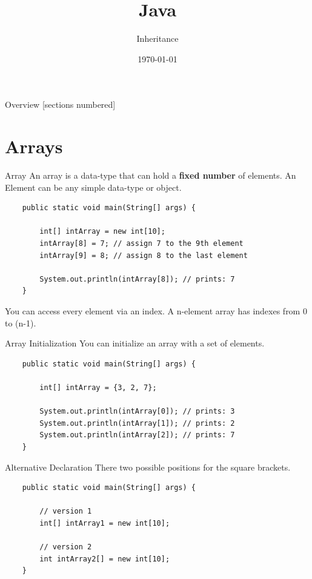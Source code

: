 


\title{Java}
\subtitle{Inheritance}
\date{\today}



\begin{frame}
	\titlepage
\end{frame}
\begin{frame}{Overview}
	[sections numbered]
	\tableofcontents
\end{frame}



\section{Arrays}
\begin{frame}[fragile]{Array}
	An array is a data-type that can hold a \textbf{fixed number} of elements. 
	An Element can be any simple data-type or object.
	\begin{lstlisting}
	public static void main(String[] args) {
	
	    int[] intArray = new int[10];
	    intArray[8] = 7; // assign 7 to the 9th element
	    intArray[9] = 8; // assign 8 to the last element
	    
	    System.out.println(intArray[8]); // prints: 7
	}
	\end{lstlisting}
	You can access every element via an index. A n-element array has indexes from 0 to (n-1).
\end{frame}

\begin{frame}[fragile]{Array Initialization} %
	You can initialize an array with a set of elements.
	\begin{lstlisting}
	public static void main(String[] args) {
	
	    int[] intArray = {3, 2, 7};
	    
	    System.out.println(intArray[0]); // prints: 3
	    System.out.println(intArray[1]); // prints: 2
	    System.out.println(intArray[2]); // prints: 7
	}
	\end{lstlisting}
\end{frame}

\begin{frame}[fragile]{Alternative Declaration}
	There two possible positions for the square brackets. 
	\begin{lstlisting}
	public static void main(String[] args) {

	    // version 1	
	    int[] intArray1 = new int[10];
	    
	    // version 2
	    int intArray2[] = new int[10];
	}
	\end{lstlisting}
\end{frame}


